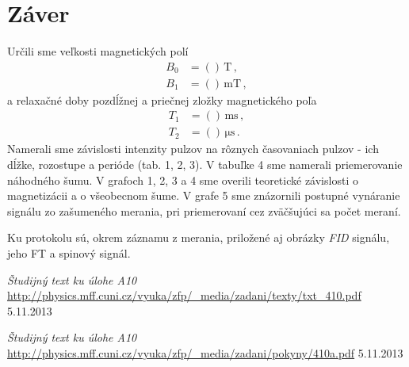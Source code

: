 \documentclass[a4paper, 10pt]{article}
\newcommand{\unit}[1]{\ensuremath{\, \mathrm{#1}}}
\begin{document}
\section*{Záver}
Určili sme veľkosti magnetických polí
\begin{align*}
B_0 &= () \unit{T}\,,\\
B_1 &= ()\unit{mT}\,,
\end{align*}
a relaxačné doby pozdĺžnej a priečnej zložky magnetického poľa
\begin{align*}
T_1 &= () \unit{ms}\,,\\
T_2 &= ()\unit{\mu s}\,.
\end{align*}
Namerali sme závislosti intenzity pulzov na rôznych časovaniach pulzov - ich dĺžke, rozostupe a perióde (tab. 1, 2, 3). V tabuľke 4 sme namerali priemerovanie náhodného šumu.
V grafoch 1, 2, 3 a 4 sme overili teoretické závislosti o magnetizácii a o všeobecnom šume. V grafe 5 sme znázornili postupné vynáranie signálu zo zašumeného merania, pri priemerovaní cez zväčšujúci sa počet meraní.

Ku protokolu sú, okrem záznamu z merania, priložené aj obrázky \textit{FID} signálu, jeho FT a spinový signál.

\begin{thebibliography}{9}

    \emph{Študijný text ku úlohe A10} \\
    \url{http://physics.mff.cuni.cz/vyuka/zfp/_media/zadani/texty/txt_410.pdf} 5.11.2013

    \emph{Študijný text ku úlohe A10} \\
    \url{http://physics.mff.cuni.cz/vyuka/zfp/_media/zadani/pokyny/410a.pdf} 5.11.2013
\end{thebibliography}
\end{document}
